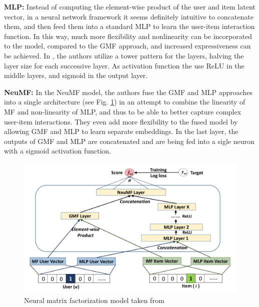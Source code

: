 \textbf{MLP:}
Instead of computing the element-wise product of the user and item latent vector, in a neural network framework it seems definitely intuitive to concatenate them, and then feed them into a standard MLP to learn the user-item interaction function.
In this way, much more flexibility and nonlinearity can be incorporated to the model, compared to the GMF approach, and increased expressiveness can be achieved. 
In \cite{he2017neural}, the authors utilize a tower pattern for the layers, halving the layer size for each successive layer.
As activation function the use ReLU in the middle layers, and sigmoid in the output layer.

\textbf{NeuMF:}
In the NeuMF model, the authors fuse the GMF and MLP approaches into a single architecture (see Fig. \ref{fig:neumf}) in an attempt to combine the linearity of MF and non-linearity of MLP, and thus to be able to better capture complex user-item interactions.
They even add more flexibility to the fused model by allowing GMF and MLP to learn separate embeddings.
In the last layer, the outputs of GMF and MLP are concatenated and are being fed into a sigle neuron with a sigmoid activation function.

\begin{figure}[t]
    \centering
    \includegraphics[width=0.8\linewidth]{images/neumf.png}
    \caption{Neural matrix factorization model taken from \cite{wang2019neural}}
    \label{fig:neumf}
\end{figure}

